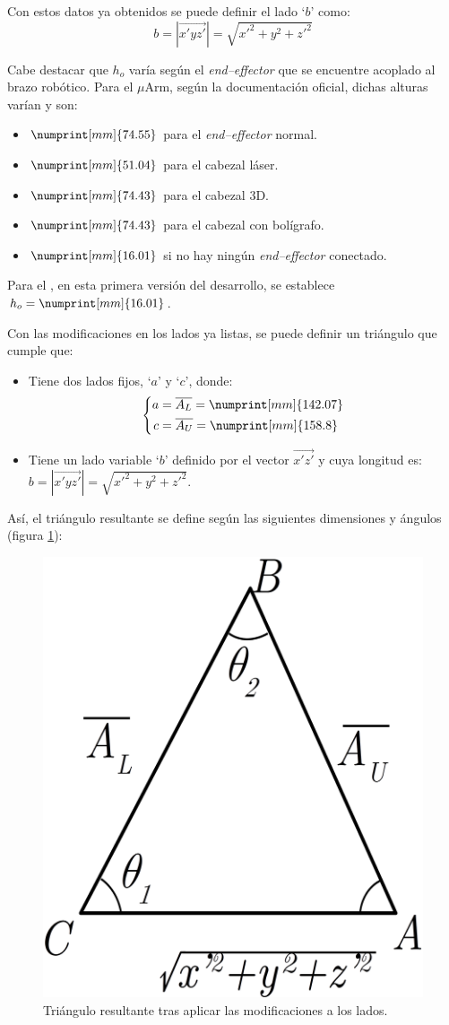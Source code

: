 Con estos datos ya obtenidos se puede definir el lado `$b$' como:
\begin{equation*}
    b = \left|\overrightarrow{x'yz'}\right| = \sqrt{x'^2 + y^2 + z'^2}
\end{equation*}

Cabe destacar que $h_o$ varía según el \textit{end--effector} que se encuentre acoplado
al brazo robótico. Para el $\mu$Arm, según la documentación oficial, dichas alturas varían
y son\cite{UArmDeveloperSwiftProForArduino}:
\begin{itemize}
    \item $\numprint[mm]{74.55}$ para el \textit{end--effector} normal.
    \item $\numprint[mm]{51.04}$ para el cabezal láser.
    \item $\numprint[mm]{74.43}$ para el cabezal 3D.
    \item $\numprint[mm]{74.43}$ para el cabezal con bolígrafo.
    \item $\numprint[mm]{16.01}$ si no hay ningún \textit{end--effector} conectado.
\end{itemize}

Para el \pArm{}, en esta primera versión del desarrollo, se establece $h_o = \numprint[mm]{16.01}$.

Con las modificaciones en los lados ya listas, se puede definir un triángulo que cumple que:
\begin{itemize}
    \item Tiene dos lados fijos, `$a$' y `$c$', donde:
    \begin{equation*}
        \left\{\begin{aligned}
            a &= \overline{A_L} = \numprint[mm]{142.07} \\
            c &= \overline{A_U} = \numprint[mm]{158.8}
        \end{aligned}\right.
    \end{equation*}
    \item Tiene un lado variable `$b$' definido por el vector $\overrightarrow{x'z'}$
    y cuya longitud es: $b = \left|\overrightarrow{x'yz'}\right| = \sqrt{x'^2 + y^2 + z'^2}$.
\end{itemize}
Así, el triángulo resultante se define según las siguientes dimensiones y ángulos (figura
\ref{fig:ik_triangle}):

\begin{figure}[H]
    \centering
    \includegraphics[width=.4\linewidth]{pictures/ik_unitary_triangle.png}
    \caption{Triángulo resultante tras aplicar las modificaciones a los lados.}
    \label{fig:ik_triangle}
\end{figure}

